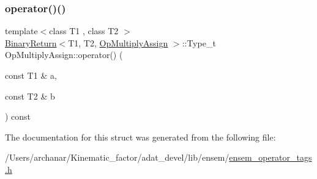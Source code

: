 \mbox{\label{structOpMultiplyAssign_a2b6f7db01199e1f98d9c495d9f3275bb}} 
\subsubsection{\texorpdfstring{operator()()}{operator()()}\hspace{0.1cm}{\footnotesize\ttfamily [2/2]}}
{\footnotesize\ttfamily template$<$class T1 , class T2 $>$ \\
\mbox{\hyperlink{structBinaryReturn}{Binary\+Return}}$<$T1, T2, \mbox{\hyperlink{structOpMultiplyAssign}{Op\+Multiply\+Assign}} $>$\+::Type\+\_\+t Op\+Multiply\+Assign\+::operator() (\begin{DoxyParamCaption}\item[{const T1 \&}]{a,  }\item[{const T2 \&}]{b }\end{DoxyParamCaption}) const\hspace{0.3cm}{\ttfamily [inline]}}



The documentation for this struct was generated from the following file\+:\begin{DoxyCompactItemize}
\item 
/\+Users/archanar/\+Kinematic\+\_\+factor/adat\+\_\+devel/lib/ensem/\mbox{\hyperlink{lib_2ensem_2ensem__operator__tags_8h}{ensem\+\_\+operator\+\_\+tags.\+h}}\end{DoxyCompactItemize}
